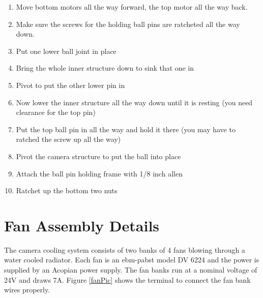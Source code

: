 \documentclass[11pt]{article}
\begin{document}
\begin{enumerate}
\item Move bottom motors all the way forward, the top motor all the way back.
\item Make sure the screws for the holding ball pins are ratcheted all the way down.
\item Put one lower ball joint in place
\item Bring the whole inner structure down to sink that one in
\item Pivot to put the other lower pin in
\item Now lower the inner structure all the way down until it is resting (you need clearance for the top pin)
\item Put the top ball pin in all the way and hold it there (you may have to ratched the screw up all the way)
\item Pivot the camera structure to put the ball into place 
\item Attach the ball pin holding frame with 1/8 inch allen
\item Ratchet up the bottom two nuts
\end{enumerate}





\section{Fan Assembly Details}

The camera cooling system consists of two banks of 4 fans blowing through a water cooled radiator.
Each fan is an ebm-pabst model DV 6224 and the power is supplied by an Acopian power supply.
The fan banks run at a nominal voltage of 24V and draws 7A.
Figure \ref{fanPic} shows the terminal to connect the fan bank wires properly.
\end{document}
